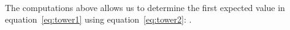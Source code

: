%
\hphantom{aha} \\[-3ex]
%
%
The computations above allows us to determine the first expected value in
equation~\eqref{eq:tower1} using equation~\eqref{eq:tower2}:
.

\vspace{-3mm}
